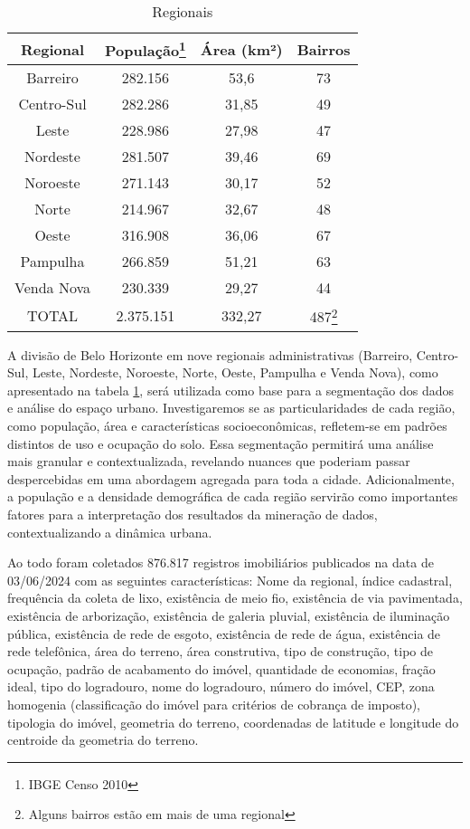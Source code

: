 \documentclass[12pt]{article}
\begin{document}
\begin{table}
    \centering
    \begin{tabular}{cccc}
Regional & População\footnote{IBGE Censo 2010} & Área (km²) & Bairros\\
\hline
Barreiro & 282.156 & 53,6 & 73\\
Centro-Sul & 282.286 & 31,85 & 49\\
Leste & 228.986 & 27,98 & 47\\
Nordeste & 281.507 & 39,46 & 69\\
Noroeste & 271.143 & 30,17 & 52\\
Norte & 214.967 & 32,67 & 48\\
Oeste & 316.908 & 36,06 & 67\\
Pampulha & 266.859 & 51,21 & 63\\
Venda Nova & 230.339 & 29,27 & 44\\
\hline
\hline
TOTAL & 2.375.151 & 332,27 & 487\footnote{Alguns bairros estão em mais de uma regional}\\

    \end{tabular}
    \caption{Regionais}
    \label{tab:regionais}
\end{table}

A divisão de Belo Horizonte em nove regionais administrativas (Barreiro, Centro-Sul, Leste, Nordeste, Noroeste, Norte, Oeste, Pampulha e Venda Nova), como apresentado na tabela \ref{tab:regionais}, será utilizada como base para a segmentação dos dados e análise do espaço urbano. Investigaremos se as particularidades de cada região, como população, área e características socioeconômicas, refletem-se em padrões distintos de uso e ocupação do solo. Essa segmentação permitirá uma análise mais granular e contextualizada, revelando nuances que poderiam passar despercebidas em uma abordagem agregada para toda a cidade. Adicionalmente, a população e a densidade demográfica de cada região servirão como importantes fatores para a interpretação dos resultados da mineração de dados, contextualizando a dinâmica urbana.

Ao todo foram coletados 876.817 registros imobiliários publicados na data de  03/06/2024 com as seguintes características: Nome da regional, índice cadastral, frequência da coleta de lixo, existência de meio fio, existência de via pavimentada, existência de arborização, existência de galeria pluvial, existência de iluminação pública, existência de rede de esgoto, existência de rede de água, existência de rede telefônica, área do terreno,  área construtiva, tipo de construção, tipo de ocupação, padrão de acabamento do imóvel, quantidade de economias, fração ideal, tipo do logradouro, nome do logradouro, número do imóvel, CEP, zona homogenia (classificação do imóvel para critérios de cobrança de imposto), tipologia do imóvel, geometria do terreno, coordenadas de latitude e longitude do centroide da geometria do terreno.
\end{document}
